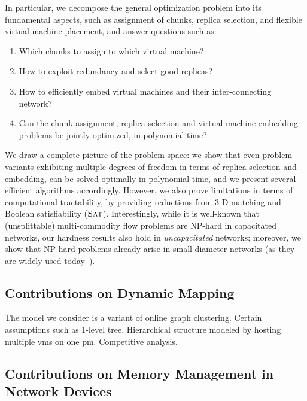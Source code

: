 In particular, we decompose the general optimization problem into its fundamental aspects, such as
assignment of chunks, replica selection, and flexible virtual machine
placement, and answer questions such as:
\begin{enumerate}
\item Which chunks to assign to which virtual machine?

\item How to exploit redundancy and select good replicas?

\item How to efficiently embed virtual machines and their inter-connecting network?

\item Can the chunk assignment, replica selection and virtual machine embedding problems be jointly optimized, in polynomial time?
\end{enumerate}

We draw a complete picture of the problem space: we show that
even problem variants exhibiting multiple degrees of freedom in terms of
replica selection and embedding,
can be solved optimally in polynomial time, and we present several efficient
algorithms accordingly. However, we also prove limitations in terms of
computational tractability, by providing reductions from 3-D matching
and Boolean satisfiability ($\textsc{Sat}$). Interestingly,
while it is well-known that (unsplittable) multi-commodity flow
problems are NP-hard in capacitated networks, our hardness results also hold in \emph{uncapacitated}
networks; moreover, we show that NP-hard problems already arise in small-diameter networks (as they are
widely used today~\cite{fattree}).

\newpage

\subsection{Contributions on Dynamic Mapping}

The model we consider is a variant of online graph clustering.
Certain assumptions such as 1-level tree. Hierarchical structure modeled by hosting multiple vms on one pm.
Competitive analysis.

\subsection{Contributions on Memory Management in Network Devices}


